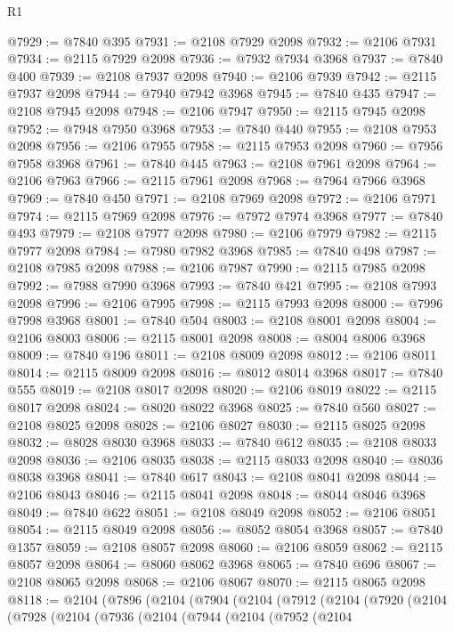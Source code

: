 \begin{lexlean}{R1}
\begin{coremodule}
@7929 := @7840 @395
@7931 := @2108 @7929 @2098
@7932 := @2106 @7931
@7934 := @2115 @7929 @2098
@7936 := @7932 @7934 @3968
@7937 := @7840 @400
@7939 := @2108 @7937 @2098
@7940 := @2106 @7939
@7942 := @2115 @7937 @2098
@7944 := @7940 @7942 @3968
@7945 := @7840 @435
@7947 := @2108 @7945 @2098
@7948 := @2106 @7947
@7950 := @2115 @7945 @2098
@7952 := @7948 @7950 @3968
@7953 := @7840 @440
@7955 := @2108 @7953 @2098
@7956 := @2106 @7955
@7958 := @2115 @7953 @2098
@7960 := @7956 @7958 @3968
@7961 := @7840 @445
@7963 := @2108 @7961 @2098
@7964 := @2106 @7963
@7966 := @2115 @7961 @2098
@7968 := @7964 @7966 @3968
@7969 := @7840 @450
@7971 := @2108 @7969 @2098
@7972 := @2106 @7971
@7974 := @2115 @7969 @2098
@7976 := @7972 @7974 @3968
@7977 := @7840 @493
@7979 := @2108 @7977 @2098
@7980 := @2106 @7979
@7982 := @2115 @7977 @2098
@7984 := @7980 @7982 @3968
@7985 := @7840 @498
@7987 := @2108 @7985 @2098
@7988 := @2106 @7987
@7990 := @2115 @7985 @2098
@7992 := @7988 @7990 @3968
@7993 := @7840 @421
@7995 := @2108 @7993 @2098
@7996 := @2106 @7995
@7998 := @2115 @7993 @2098
@8000 := @7996 @7998 @3968
@8001 := @7840 @504
@8003 := @2108 @8001 @2098
@8004 := @2106 @8003
@8006 := @2115 @8001 @2098
@8008 := @8004 @8006 @3968
@8009 := @7840 @196
@8011 := @2108 @8009 @2098
@8012 := @2106 @8011
@8014 := @2115 @8009 @2098
@8016 := @8012 @8014 @3968
@8017 := @7840 @555
@8019 := @2108 @8017 @2098
@8020 := @2106 @8019
@8022 := @2115 @8017 @2098
@8024 := @8020 @8022 @3968
@8025 := @7840 @560
@8027 := @2108 @8025 @2098
@8028 := @2106 @8027
@8030 := @2115 @8025 @2098
@8032 := @8028 @8030 @3968
@8033 := @7840 @612
@8035 := @2108 @8033 @2098
@8036 := @2106 @8035
@8038 := @2115 @8033 @2098
@8040 := @8036 @8038 @3968
@8041 := @7840 @617
@8043 := @2108 @8041 @2098
@8044 := @2106 @8043
@8046 := @2115 @8041 @2098
@8048 := @8044 @8046 @3968
@8049 := @7840 @622
@8051 := @2108 @8049 @2098
@8052 := @2106 @8051
@8054 := @2115 @8049 @2098
@8056 := @8052 @8054 @3968
@8057 := @7840 @1357
@8059 := @2108 @8057 @2098
@8060 := @2106 @8059
@8062 := @2115 @8057 @2098
@8064 := @8060 @8062 @3968
@8065 := @7840 @696
@8067 := @2108 @8065 @2098
@8068 := @2106 @8067
@8070 := @2115 @8065 @2098
@8118 := @2104
    (@7896
      (@2104
        (@7904
          (@2104
            (@7912
              (@2104
                (@7920
                  (@2104
                    (@7928
                      (@2104
                        (@7936
                          (@2104
                            (@7944
                              (@2104
                                (@7952
                                  (@2104

\end{coremodule}
\end{lexlean}
